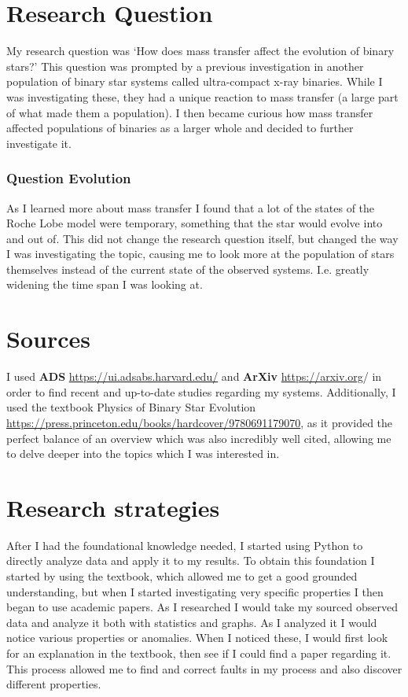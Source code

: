 \documentclass[12pt, a4paper]{article}
\begin{document}
\section{Research Question}
    My research question was `How does mass transfer affect the evolution of binary stars?' This question was prompted by a previous investigation in another population of binary star systems called ultra-compact x-ray binaries. While I was investigating these, they had a unique reaction to mass transfer (a large part of what made them a population). I then became curious how mass transfer affected populations of binaries as a larger whole and decided to further investigate it.

    \subsubsection{Question Evolution}    
        As I learned more about mass transfer I found that a lot of the states of the Roche Lobe model were temporary, something that the star would evolve into and out of. This did not change the research question itself, but changed the way I was investigating the topic, causing me to look more at the population of stars themselves instead of the current state of the observed systems. I.e. greatly widening the time span I was looking at.
\section{Sources}
    I used \textbf{ADS} \url{https://ui.adsabs.harvard.edu/} and \textbf{ArXiv} \url{https://arxiv.org}/ in order to find recent and up-to-date studies regarding my systems. Additionally, I used the textbook Physics of Binary Star Evolution \url{https://press.princeton.edu/books/hardcover/9780691179070}, as it provided the perfect balance of an overview which was also incredibly well cited, allowing me to delve deeper into the topics which I was interested in. 
\section{Research strategies}
   After I had the foundational knowledge needed, I started using Python to directly analyze data and apply it to my results. To obtain this foundation I started by using the textbook, which allowed me to get a good grounded understanding, but when I started investigating very specific properties I then began to use academic papers. As I researched I would take my sourced observed data and analyze it both with statistics and graphs. As I analyzed it I would notice various properties or anomalies. When I noticed these, I would first look for an explanation in the textbook, then see if I could find a paper regarding it. This process allowed me to find and correct faults in my process and also discover different properties.
\end{document}
